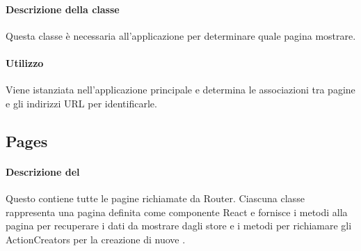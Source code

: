 \paragraph*{Descrizione della classe}
Questa classe è necessaria all'applicazione per determinare quale pagina mostrare.
\paragraph*{Utilizzo}
Viene istanziata nell'applicazione principale e determina le associazioni tra pagine e gli indirizzi URL per identificarle.

\subsection{Pages}
\paragraph*{Descrizione del }
Questo  contiene tutte le pagine richiamate da Router. Ciascuna classe rappresenta una pagina definita come componente React e fornisce i metodi alla pagina per recuperare i dati da mostrare dagli store e i metodi per richiamare gli ActionCreators per la creazione di nuove .
